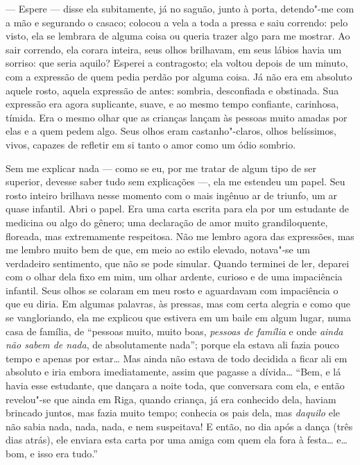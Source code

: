 --- Espere --- disse ela subitamente, já no saguão, junto à porta,
detendo"-me com a mão e segurando o casaco; colocou a vela a toda a
pressa e saiu correndo: pelo visto, ela se lembrara de alguma coisa ou
queria trazer algo para me mostrar. Ao sair correndo, ela corara
inteira, seus olhos brilhavam, em seus lábios havia um sorriso: que
seria aquilo? Esperei a contragosto; ela voltou depois de um minuto,
com a expressão de quem pedia perdão por alguma coisa. Já não era em
absoluto aquele rosto, aquela expressão de antes: sombria, desconfiada
e obstinada. Sua expressão era agora suplicante, suave, e ao mesmo
tempo confiante, carinhosa, tímida. Era o mesmo olhar que as crianças
lançam às pessoas muito amadas por elas e a quem pedem algo. Seus olhos
eram castanho"-claros, olhos belíssimos, vivos, capazes de refletir em
si tanto o amor como um ódio sombrio.

Sem me explicar nada --- como se eu, por me tratar de algum tipo de ser
superior, devesse saber tudo sem explicações ---, ela me estendeu um papel. Seu
rosto inteiro brilhava nesse momento com o mais ingênuo ar de triunfo, um ar
quase infantil. Abri o papel. Era uma carta escrita para ela por um estudante
de medicina ou algo do gênero; uma declaração de amor muito grandiloquente,
floreada, mas extremamente respeitosa.  Não me lembro agora das expressões, mas
me lembro muito bem de que, em meio ao estilo elevado, notava"-se um verdadeiro
sentimento, que não se pode simular. Quando terminei de ler, deparei com o
olhar dela fixo em mim, um olhar ardente, curioso e de uma impaciência
infantil. Seus olhos se colaram em meu rosto e aguardavam com impaciência o que
eu diria. Em algumas palavras, às pressas, mas com certa alegria e como que se
vangloriando, ela me explicou que estivera em um baile em algum lugar, numa
casa de família, de “pessoas muito, muito boas, \textit{pessoas de família} e
onde \textit{ainda não sabem de nada}, de absolutamente nada”; porque ela
estava ali fazia pouco tempo e apenas por estar\ldots{} Mas ainda não estava de
todo decidida a ficar ali em absoluto e iria embora imediatamente, assim que
pagasse a dívida\ldots{} “Bem, e lá havia esse estudante, que dançara a noite
toda, que conversara com ela, e então revelou"-se que ainda em Riga, quando
criança, já era conhecido dela, haviam brincado juntos, mas fazia muito tempo;
conhecia os pais dela, mas \textit{daquilo} ele não sabia nada, nada, nada, e
nem suspeitava! E então, no dia após a dança (três dias atrás), ele enviara
esta carta por uma amiga com quem ela fora à festa\ldots{} e\ldots{} bom, e
isso era tudo.”

